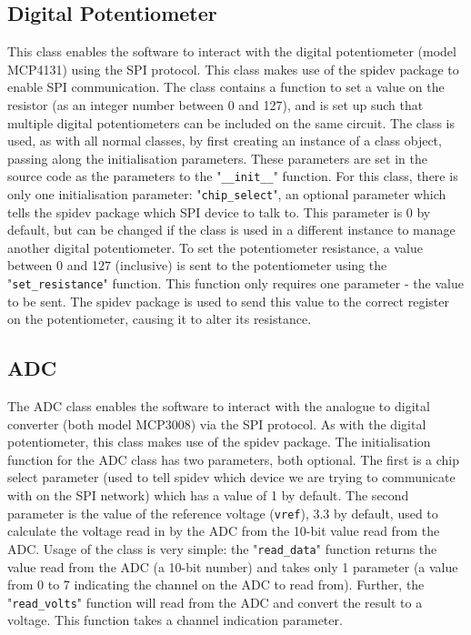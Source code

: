\documentclass[twoside,a4]{report}
\def\br{\newline \newline \noindent}
\begin{document}
	\subsection*{Digital Potentiometer} %
	This class enables the software to interact with the digital potentiometer (model MCP4131) using the SPI protocol. This class makes use of the spidev package to enable SPI communication. The class contains a function to set a value on the resistor (as an integer number between 0 and 127), and is set up such that multiple digital potentiometers can be included on the same circuit.\br
	The class is used, as with all normal classes, by first creating an instance of a class object, passing along the initialisation parameters. These parameters are set in the source code as the parameters to the "\texttt{\_\_init\_\_}" function. For this class, there is only one initialisation parameter: "\texttt{chip\_select}", an optional parameter which tells the spidev package which SPI device to talk to. This parameter is 0 by default, but can be changed if the class is used in a different instance to manage another digital potentiometer.\br
	To set the potentiometer resistance, a value between 0 and 127 (inclusive) is sent to the potentiometer using the "\texttt{set\_resistance}" function. This function only requires one parameter - the value to be sent. The spidev package is used to send this value to the correct register on the potentiometer, causing it to alter its resistance.
	
	\subsection*{ADC} %
	The ADC class enables the software to interact with the analogue to digital converter (both model MCP3008) via the SPI protocol. As with the digital potentiometer, this class makes use of the spidev package. \br
	The initialisation function for the ADC class has two parameters, both optional. The first is a chip select parameter (used to tell spidev which device we are trying to communicate with on the SPI network) which has a value of 1 by default. The second parameter is the value of the reference voltage (\texttt{vref}), 3.3 by default, used to calculate the voltage read in by the ADC from the 10-bit value read from the ADC. \br
	Usage of the class is very simple: the "\texttt{read\_data}" function returns the value read from the ADC (a 10-bit number) and takes only 1 parameter (a value from 0 to 7 indicating the channel on the ADC to read from). Further, the "\texttt{read\_volts}" function will read from the ADC and convert the result to a voltage. This function takes a channel indication parameter.
	
\end{document}
